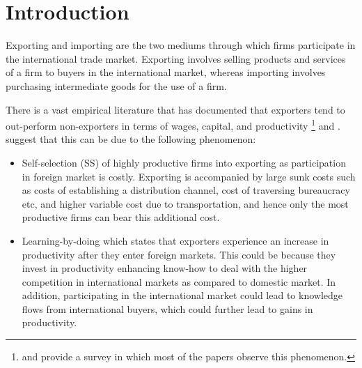 \documentclass[12pt]{article}
\begin{document}
%

\newpage
\small

\tableofcontents

\newpage
{}
\section{Introduction}\label{sec:introduction}

Exporting and importing are the two mediums through which firms
participate in the international trade market. Exporting involves
selling products and services of a firm to buyers in the international
market, whereas importing involves purchasing intermediate goods for
the use of a firm.  


There is a vast empirical literature  that has documented that exporters tend to
out-perform non-exporters  in terms of wages, capital, and
productivity \footnote{\textcite{wagner2007exports} and
  \textcite{bernard2007firms} provide a  survey in which most of the
  papers observe this phenomenon.} and .%
   \textcite{bernard1999exceptional}  suggest that this can be due
to the following phenomenon:
\begin{itemize}
\item Self-selection (SS) of highly productive firms into exporting as  
participation in foreign market is costly. Exporting is accompanied by large
sunk costs
such as costs of establishing a distribution channel,
cost of traversing bureaucracy etc, and higher variable cost due to 
transportation, and hence only the most productive firms can bear this
additional cost. 
\item Learning-by-doing which states that exporters experience an
  increase in productivity after they enter foreign markets. This
  could be because  they invest in productivity enhancing know-how
 to deal with the higher competition in international markets as compared to
domestic market. In addition, participating in the
international market could lead to knowledge flows from international
buyers, which could further lead to gains in productivity.
\end{itemize}
\end{document}
